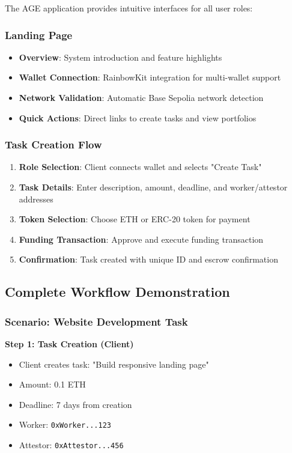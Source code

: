 \documentclass[12pt,a4paper]{article}
\begin{document}
The AGE application provides intuitive interfaces for all user roles:

\subsubsection{Landing Page}
\begin{itemize}
    \item \textbf{Overview}: System introduction and feature highlights
    \item \textbf{Wallet Connection}: RainbowKit integration for multi-wallet support
    \item \textbf{Network Validation}: Automatic Base Sepolia network detection
    \item \textbf{Quick Actions}: Direct links to create tasks and view portfolios
\end{itemize}

\subsubsection{Task Creation Flow}
\begin{enumerate}
    \item \textbf{Role Selection}: Client connects wallet and selects "Create Task"
    \item \textbf{Task Details}: Enter description, amount, deadline, and worker/attestor addresses
    \item \textbf{Token Selection}: Choose ETH or ERC-20 token for payment
    \item \textbf{Funding Transaction}: Approve and execute funding transaction
    \item \textbf{Confirmation}: Task created with unique ID and escrow confirmation
\end{enumerate}

\subsection{Complete Workflow Demonstration}

\subsubsection{Scenario: Website Development Task}

\textbf{Step 1: Task Creation (Client)}
\begin{itemize}
    \item Client creates task: "Build responsive landing page"
    \item Amount: 0.1 ETH
    \item Deadline: 7 days from creation
    \item Worker: \texttt{0xWorker...123}
    \item Attestor: \texttt{0xAttestor...456}
\end{itemize}
\end{document}
